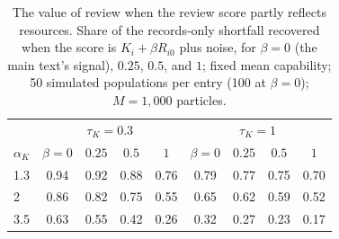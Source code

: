 \begin{table}[t]
\centering
\small
\caption{The value of review when the review score partly reflects resources. Share of the records-only shortfall recovered when the score is $K_i + \beta R_{i0}$ plus noise, for $\beta = 0$ (the main text's signal), $0.25$, $0.5$, and $1$; fixed mean capability; 50 simulated populations per entry (100 at $\beta = 0$); $M = 1{,}000$ particles.}
\label{tab:sens-contam}
\begin{tabular}{@{}lcccccccc@{}}
\toprule
& \multicolumn{4}{c}{$\tau_K = 0.3$} & \multicolumn{4}{c}{$\tau_K = 1$} \\
$\alpha_K$ & $\beta = 0$ & $0.25$ & $0.5$ & $1$ & $\beta = 0$ & $0.25$ & $0.5$ & $1$ \\
\midrule
1.3 & 0.94 & 0.92 & 0.88 & 0.76 & 0.79 & 0.77 & 0.75 & 0.70 \\
2 & 0.86 & 0.82 & 0.75 & 0.55 & 0.65 & 0.62 & 0.59 & 0.52 \\
3.5 & 0.63 & 0.55 & 0.42 & 0.26 & 0.32 & 0.27 & 0.23 & 0.17 \\
\bottomrule
\end{tabular}
\end{table}
